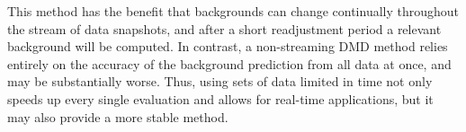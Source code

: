 This method has the benefit that backgrounds can change continually throughout the stream of data snapshots, and after a short readjustment period a relevant background will be computed. In contrast, a non-streaming DMD method relies entirely on the accuracy of the background prediction from all data at once, and may be substantially worse. Thus, using sets of data limited in time not only speeds up every single evaluation and allows for real-time applications, but it may also provide a more stable method.
